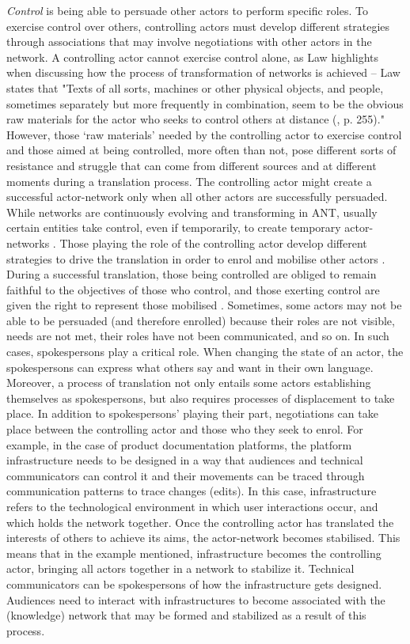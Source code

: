 \textit{Control} is being able to persuade other actors to perform specific roles. To exercise control over others, controlling actors must develop different strategies through associations that may involve negotiations with other actors in the network. A controlling actor cannot exercise control alone, as Law highlights when discussing how the process of transformation of networks is achieved – Law states that "Texts of all sorts, machines or other physical objects, and people, sometimes separately but more frequently in combination, seem to be the obvious raw materials for the actor who seeks to control others at distance (\cite{law1986heterogeneity}, p. 255)." However, those ‘raw materials’ needed by the controlling actor to exercise control and those aimed at being controlled, more often than not, pose different sorts of resistance and struggle \cite{law1992notes} that can come from different sources and at different moments during a translation process. The controlling actor might create a successful actor-network only when all other actors are successfully persuaded. While networks are continuously evolving and transforming in ANT, usually certain entities take control, even if temporarily, to create temporary actor-networks \cite{callon1986sociology, law1986heterogeneity}. Those playing the role of the controlling actor develop different strategies to drive the translation in order to enrol and mobilise other actors \cite{blackburn2002project}. During a successful translation, those being controlled are obliged to remain faithful to the objectives of those who control, and those exerting control are given the right to represent those mobilised \cite{callon1986sociology}. Sometimes, some actors may not be able to be persuaded (and therefore enrolled) because their roles are not visible, needs are not met, their roles have not been communicated, and so on. In such cases, spokespersons play a critical role. When changing the state of an actor, the spokespersons can express what others say and want in their own language. Moreover, a process of translation not only entails some actors establishing themselves as spokespersons, but also requires processes of displacement to take place. In addition to spokespersons' playing their part, negotiations can take place between the controlling actor and those who they seek to enrol. For example, in the case of product documentation platforms, the platform infrastructure needs to be designed in a way that audiences and technical communicators can control it and their movements can be traced through communication patterns to trace changes (edits). In this case, infrastructure refers to the technological environment in which user interactions occur, and which holds the network together. Once the controlling actor has translated the interests of others to achieve its aims, the actor-network becomes stabilised. This means that in the example mentioned, infrastructure becomes the controlling actor, bringing all actors together in a network to stabilize it. Technical communicators can be spokespersons of how the infrastructure gets designed. Audiences need to interact with infrastructures to become associated with the (knowledge) network that may be formed and stabilized as a result of this process.

